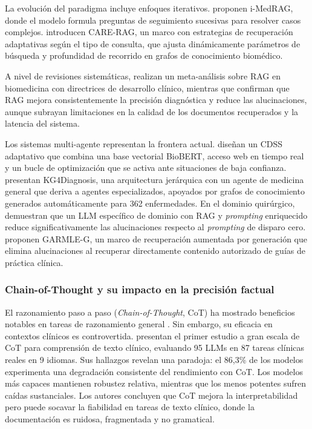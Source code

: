 La evolución del paradigma incluye enfoques iterativos. \textcite{xiong2024imedrag} proponen i-MedRAG, donde el modelo formula preguntas de seguimiento sucesivas para resolver casos complejos. \textcite{Kumari2026} introducen CARE-RAG, un marco con estrategias de recuperación adaptativas según el tipo de consulta, que ajusta dinámicamente parámetros de búsqueda y profundidad de recorrido en grafos de conocimiento biomédico.

A nivel de revisiones sistemáticas, \textcite{Liu2025ragsystematic} realizan un meta-análisis sobre \ac{RAG} en biomedicina con directrices de desarrollo clínico, mientras que \textcite{Amugongo2025systematic,gargari2025rag_medical_review} confirman que \ac{RAG} mejora consistentemente la precisión diagnóstica y reduce las alucinaciones, aunque subrayan limitaciones en la calidad de los documentos recuperados y la latencia del sistema.

Los sistemas multi-agente representan la frontera actual. \textcite{Ogdu2025adaptive} diseñan un \ac{CDSS} adaptativo que combina una base vectorial BioBERT, acceso web en tiempo real y un bucle de optimización que se activa ante situaciones de baja confianza. \textcite{Zuo2025KG4Diagnosis} presentan KG4Diagnosis, una arquitectura jerárquica con un agente de medicina general que deriva a agentes especializados, apoyados por grafos de conocimiento generados automáticamente para 362 enfermedades. En el dominio quirúrgico, \textcite{staple2025surgical} demuestran que un \ac{LLM} específico de dominio con \ac{RAG} y \emph{prompting} enriquecido reduce significativamente las alucinaciones respecto al \emph{prompting} de disparo cero. \textcite{Li2025garmleg} proponen GARMLE-G, un marco de recuperación aumentada por generación que elimina alucinaciones al recuperar directamente contenido autorizado de guías de práctica clínica.

\subsubsection{Chain-of-Thought y su impacto en la precisión factual}

El razonamiento paso a paso (\emph{Chain-of-Thought}, CoT) ha mostrado beneficios notables en tareas de razonamiento general \parencite{Wei2022cot}. Sin embargo, su eficacia en contextos clínicos es controvertida. \textcite{Wu2025CoTFails} presentan el primer estudio a gran escala de CoT para comprensión de texto clínico, evaluando 95 \ac{LLM}s en 87 tareas clínicas reales en 9 idiomas. Sus hallazgos revelan una paradoja: el 86,3\% de los modelos experimenta una degradación consistente del rendimiento con CoT. Los modelos más capaces mantienen robustez relativa, mientras que los menos potentes sufren caídas sustanciales. Los autores concluyen que CoT mejora la interpretabilidad pero puede socavar la fiabilidad en tareas de texto clínico, donde la documentación es ruidosa, fragmentada y no gramatical.

